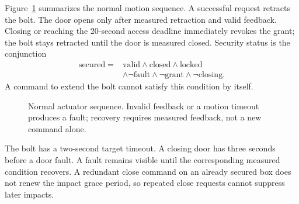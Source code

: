 \documentclass[conference,letterpaper]{IEEEtran}
\begin{document}
Figure~\ref{fig:states} summarizes the normal motion sequence. A successful request retracts the bolt. The door opens only after measured retraction and valid feedback. Closing or reaching the 20-second access deadline immediately revokes the grant; the bolt stays retracted until the door is measured closed. Security status is the conjunction
\begin{equation}
\begin{aligned}
\mathrm{secured}={}&\mathrm{valid}\land\mathrm{closed}\land\mathrm{locked}\\
&\land\neg\mathrm{fault}\land\neg\mathrm{grant}\land\neg\mathrm{closing}.
\end{aligned}
\label{eq:secure}
\end{equation}
A command to extend the bolt cannot satisfy this condition by itself.
\begin{figure}[t]
\centering
{}
\caption{Normal actuator sequence. Invalid feedback or a motion timeout produces a fault; recovery requires measured feedback, not a new command alone.}\label{fig:states}
\end{figure}

The bolt has a two-second target timeout. A closing door has three seconds before a door fault. A fault remains visible until the corresponding measured condition recovers. A redundant close command on an already secured box does not renew the impact grace period, so repeated close requests cannot suppress later impacts.
\end{document}
